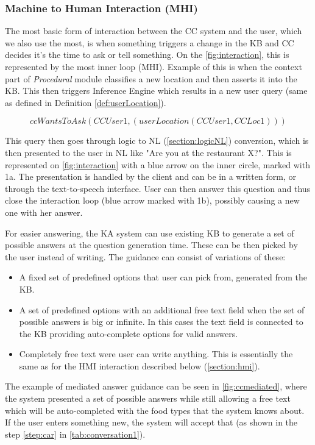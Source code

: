\subsubsection{Machine to Human Interaction (MHI)}
\label{section:mhi}
The most basic form of interaction between the CC system and the user, which
we also use the most, is when something triggers a change in the KB and 
CC decides it's the time to ask or tell something. On the 
\autoref{fig:interaction}, this is represented by the most inner loop (MHI). 
Example of this is when the context part of \emph{Procedural} module classifies
a new location and then asserts it into the KB. This then triggers Inference 
Engine which results in a new user query (same as defined in Definition
\ref{def:userLocation}).

\begin{equation*}
	\label{eq:ccWantsLoc}
	ccWantsToAsk(CCUser1, (userLocation(CCUser1,CCLoc1)))
\end{equation*}

This query then goes through logic to NL (\autoref{section:logicNL}) 
conversion, which is then
presented to the user in NL like "Are you at the restaurant X?".
This is represented on \autoref{fig:interaction} with a blue arrow on the
inner circle, marked with 1a. The presentation is handled by the client and 
can be in a written form, or through the text-to-speech interface. User can then 
answer this question and thus close the interaction loop (blue arrow marked with
1b), possibly causing a new one with her answer. 

For easier answering, the KA system can use existing KB to generate a set of 
possible answers at the question generation time. These can be then picked by
the user instead of writing. The guidance can consist of variations of these:
\begin{itemize}
	\item A fixed set of predefined options that user can pick from, generated
	from the KB.
	\item A set of predefined options with an additional free text field when
	the set of possible answers is big or infinite. In this cases the text field
	is connected to the KB providing auto-complete options for valid answers.
	\item Completely free text were user can write anything. This is essentially
	the same as for the HMI interaction described below (\autoref{section:hmi}).
\end{itemize}

The example of mediated answer guidance can be seen in \autoref{fig:ccmediated},
where the system presented a set of possible answers while still allowing a 
free text 
which will be auto-completed with the food types that the system knows about. 
If the user enters something new, the system will accept that (as shown 
in the step \ref{step:car} in \autoref{tab:conversation1}).

